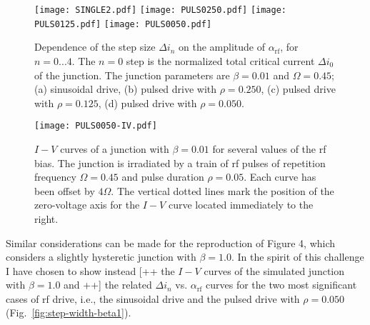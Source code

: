 \begin{figure}[tbh]
	\centering
	\texttt{[image: SINGLE2.pdf]}
	\texttt{[image: PULS0250.pdf]}
	\texttt{[image: PULS0125.pdf]}
	\texttt{[image: PULS0050.pdf]}
	\caption{Dependence of the step size $\Delta i_n$ on the amplitude of  $\alpha_\mathrm{rf}$, for $n = 0. . . 4$. The $n = 0$ step is the normalized total critical current $\Delta i_0$ of the junction. The junction parameters are $\beta = 0. 01$ and $\Omega = 0. 45$; (a) sinusoidal drive, (b) pulsed drive with $\rho = 0. 250$, (c) pulsed drive with $\rho = 0. 125$, (d) pulsed drive with $\rho = 0. 050$.}
	\label{fig:step-width}
\end{figure}

\begin{figure}[tbh]
	\centering
	\texttt{[image: PULS0050-IV.pdf]}
	\caption{$I - V$ curves of a junction with $\beta = 0.01$ for several values of the rf bias. The junction is  irradiated by a train of rf pulses of repetition frequency $\Omega = 0.45$ and pulse duration $\rho = 0.05$. Each curve has been offset by $4 \Omega$. The vertical dotted lines mark the position of the zero-voltage axis for the $I - V$ curve located immediately to the right.}
	\label{fig:pulsed-ivs}
\end{figure}


Similar considerations can be made for the reproduction of Figure 4, which considers a slightly hysteretic junction with $\beta = 1.0$. In the spirit of this challenge I have chosen to show instead [++ the $I - V$ curves of the simulated junction with $\beta = 1.0$ and ++] the related $\Delta i_n$ vs. $\alpha_\mathrm{rf}$ curves for the two most significant cases of rf drive, i.e., the sinusoidal drive and the pulsed drive with $\rho = 0.050$ (Fig.~\ref{fig:step-width-beta1}).

